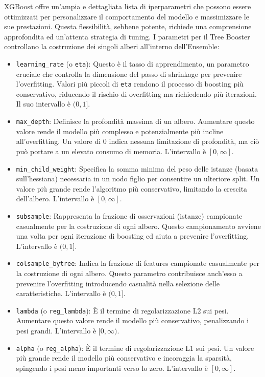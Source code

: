 \documentclass[a4paper,12pt]{report}
\begin{document}
	XGBoost offre un'ampia e dettagliata lista di iperparametri che possono essere ottimizzati per personalizzare il comportamento del modello e massimizzare le sue prestazioni. Questa flessibilità, sebbene potente, richiede una comprensione approfondita ed un'attenta strategia di tuning.
	I parametri per il Tree Booster controllano la costruzione dei singoli alberi all'interno dell'Ensemble:
	\begin{itemize}
		\item \texttt{learning\_rate} (o \texttt{eta}): Questo è il tasso di apprendimento, un parametro cruciale che controlla la dimensione del passo di shrinkage per prevenire l'overfitting. Valori più piccoli di \texttt{eta} rendono il processo di boosting più conservativo, riducendo il rischio di overfitting ma richiedendo più iterazioni. Il suo intervallo è $(0, 1]$.
		\item \texttt{max\_depth}: Definisce la profondità massima di un albero. Aumentare questo valore rende il modello più complesso e potenzialmente più incline all'overfitting. Un valore di $0$ indica nessuna limitazione di profondità, ma ciò può portare a un elevato consumo di memoria. L'intervallo è $[0, \infty]$.
		\item \texttt{min\_child\_weight}: Specifica la somma minima del peso delle istanze (basata sull'hessiana) necessaria in un nodo figlio per consentire un ulteriore split. Un valore più grande rende l'algoritmo più conservativo, limitando la crescita dell'albero. L'intervallo è $[0, \infty]$.
		\item \texttt{subsample}: Rappresenta la frazione di osservazioni (istanze) campionate casualmente per la costruzione di ogni albero. Questo campionamento avviene una volta per ogni iterazione di boosting ed aiuta a prevenire l'overfitting. L'intervallo è $(0, 1]$.
		\item \texttt{colsample\_bytree}: Indica la frazione di features campionate casualmente per la costruzione di ogni albero. Questo parametro contribuisce anch'esso a prevenire l'overfitting introducendo casualità nella selezione delle caratteristiche. L'intervallo è $(0, 1]$.
		\item \texttt{lambda} (o \texttt{reg\_lambda}): È il termine di regolarizzazione L2 sui pesi. Aumentare questo valore rende il modello più conservativo, penalizzando i pesi grandi. L'intervallo è $[0, \infty)$.
		\item \texttt{alpha} (o \texttt{reg\_alpha}): È il termine di regolarizzazione L1 sui pesi. Un valore più grande rende il modello più conservativo e incoraggia la sparsità, spingendo i pesi meno importanti verso lo zero. L'intervallo è $[0, \infty]$.
	\end{itemize}
\end{document}
